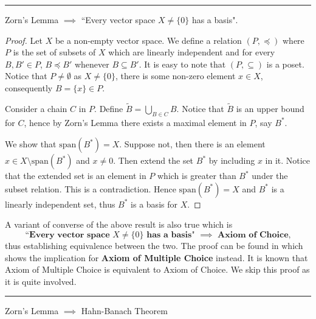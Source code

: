 \documentclass[11pt,a4paper]{article}
\begin{document}
\par\noindent\rule{\textwidth}{0.4pt}

\begin{theorem}
    Zorn's Lemma $\implies$ ``Every vector space $X\neq \{0\}$ has a basis".
\end{theorem}

\begin{proof}
    Let $X$ be a non-empty vector space. We define a relation $(P,\preccurlyeq)$ where $P$ is the set of subsets of $X$ which are linearly independent and for every $B,B'\in P$, $B\preccurlyeq B'$ whenever $B\subseteq B'$. It is easy to note that $(P,\subseteq)$ is a poset. Notice that $P\neq \emptyset$ as $X\neq \{0\}$, there is some non-zero element $x\in X$, consequently $B = \{x\}\in P$.
    
    Consider a chain $C$ in $P$. Define $\tilde{B} = \bigcup_{B\in C}B$. Notice that $\tilde{B}$ is an upper bound for $C$, hence by Zorn's Lemma there exists a maximal element in $P$, say $B^*$.
    
    We show that $\text{span}(B^*) = X$. Suppose not, then there is an element $x\in X\setminus \text{span}(B^*)$ and $x\neq 0$. Then extend the set $B^*$ by including $x$ in it. Notice that the extended set is an element in $P$ which is greater than $B^*$ under the subset relation. This is a contradiction. Hence $\text{span}(B^*) = X$ and $B^*$ is a linearly independent set, thus $B^*$ is a basis for $X$.
\end{proof}

\begin{remark}
    A variant of converse of the above result is also true which is 
    $$
    \textbf{``Every vector space $X\neq \{0\}$ has a basis" $\implies$ Axiom of Choice,}
    $$
    thus establishing equivalence between the two. The proof can be found in \textbf{\cite{bases_AC}} which shows the implication for \textbf{Axiom of Multiple Choice} instead. It is known that Axiom of Multiple Choice is equivalent to Axiom of Choice. We skip this proof as it is quite involved.
\end{remark}


\par\noindent\rule{\textwidth}{0.4pt}

\begin{theorem}
    Zorn's Lemma $\implies$ Hahn-Banach Theorem
\end{theorem}
\end{document}
